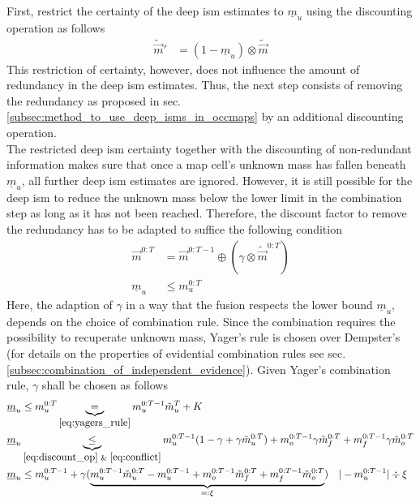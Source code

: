 \\
First, restrict the certainty of the deep \gls{ism} estimates to $\underline{m}_u$ using the discounting operation as follows
\begin{align}
	\tilde{\vec{m}}' &= (1-\underline{m}_u) \otimes \tilde{\vec{m}}
\end{align}
This restriction of certainty, however, does not influence the amount of redundancy in the deep \gls{ism} estimates. Thus, the next step consists of removing the redundancy as proposed in sec. \ref{subsec:method_to_use_deep_isms_in_occmaps} by an additional discounting operation.\\
The restricted deep \gls{ism} certainty together with the discounting of non-redundant information makes sure that once a map cell's unknown mass has fallen beneath $\underline{m}_u$, all further deep \gls{ism} estimates are ignored. However, it is still possible for the deep \gls{ism} to reduce the unknown mass below the lower limit in the combination step as long as it has not been reached. Therefore, the discount factor to remove the redundancy has to be adapted to suffice the following condition
\begin{align}
	\vec{m}^{0:T} &= \vec{m}^{0:T-1} \oplus (\gamma \otimes \tilde{\vec{m}}^{0:T})\\
	\underline{m}_u &\leq m^{0:T}_{u}
\end{align} 
Here, the adaption of $\gamma$ in a way that the fusion respects the lower bound $\underline{m}_{u}$, depends on the choice of combination rule. Since the combination requires the possibility to recuperate unknown mass, Yager's rule is chosen over Dempster's (for details on the properties of evidential combination rules see sec. \ref{subsec:combination_of_independent_evidence}). Given Yager's combination rule, $\gamma$ shall be chosen as follows
\begin{align}
	\underline{m}_u &\leq m^{0:T}_{u} \underbrace{=}_{\eqref{eq:yagers_rule}} m_{u}^{0:T-1}\tilde{m}_{u}^{T}+K \\
%
	\underline{m}_u & \underbrace{\leq}_{\eqref{eq:discount_op}\text{ \& }\eqref{eq:conflict}} m_{u}^{0:T-1}(1-\gamma+\gamma\tilde{m}_{u}^{0:T}) + m_{o}^{0:T-1}\gamma\tilde{m}_{f}^{0:T} + m_{f}^{0:T-1}\gamma\tilde{m}_{o}^{0:T}\\
%
	\underline{m}_u &\leq m_{u}^{0:T-1} + \gamma (\underbrace{m_{u}^{0:T-1}\tilde{m}_{u}^{0:T} - m_{u}^{0:T-1} + m_{o}^{0:T-1}\tilde{m}_{f}^{0:T} + m_{f}^{0:T-1}\tilde{m}_{o}^{0:T}}_{=: \xi}) \quad|-m_{u}^{0:T-1} |\div\xi
\end{align}

